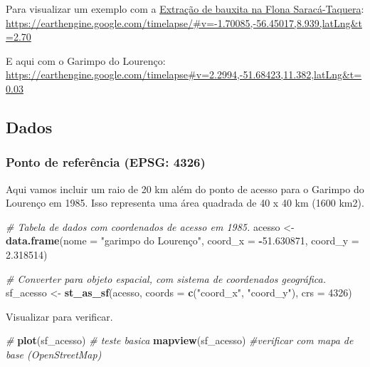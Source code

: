 \documentclass[
]{article}
\newenvironment{Shaded}{\begin{snugshade}}{\end{snugshade}}
\newcommand{\AttributeTok}[1]{\textcolor[rgb]{0.13,0.29,0.53}{#1}}
\newcommand{\CommentTok}[1]{\textcolor[rgb]{0.56,0.35,0.01}{\textit{#1}}}
\newcommand{\DecValTok}[1]{\textcolor[rgb]{0.00,0.00,0.81}{#1}}
\newcommand{\FloatTok}[1]{\textcolor[rgb]{0.00,0.00,0.81}{#1}}
\newcommand{\FunctionTok}[1]{\textcolor[rgb]{0.13,0.29,0.53}{\textbf{#1}}}
\newcommand{\NormalTok}[1]{#1}
\newcommand{\OtherTok}[1]{\textcolor[rgb]{0.56,0.35,0.01}{#1}}
\newcommand{\SpecialCharTok}[1]{\textcolor[rgb]{0.81,0.36,0.00}{\textbf{#1}}}
\newcommand{\StringTok}[1]{\textcolor[rgb]{0.31,0.60,0.02}{#1}}
\begin{document}
Para visualizar um exemplo com a \href{https://cpisp.org.br/mais-uma-uc-na-amazonia-sob-risco-mineracao-ameaca-flona-saraca-taquera-no-para/}{Extração de bauxita na Flona Saracá-Taquera}:
\url{https://earthengine.google.com/timelapse/\#v=-1.70085,-56.45017,8.939,latLng\&t=2.70}

E aqui com o Garimpo do Lourenço:
\url{https://earthengine.google.com/timelapse\#v=2.2994,-51.68423,11.382,latLng\&t=0.03}

\hypertarget{dados-2}{%
\subsection{Dados}\label{dados-2}}

\hypertarget{ponto-de-referuxeancia-epsg-4326}{%
\subsubsection{Ponto de referência (EPSG: 4326)}\label{ponto-de-referuxeancia-epsg-4326}}

Aqui vamos incluir um raio de 20 km além do ponto de acesso para
o Garimpo do Lourenço em 1985.
Isso representa uma área quadrada de 40 x 40 km (1600 km2).

\begin{Shaded}
\begin{Highlighting}[]
\CommentTok{\# Tabela de dados com coordenados de acesso em 1985.}
\NormalTok{acesso }\OtherTok{\textless{}{-}} \FunctionTok{data.frame}\NormalTok{(}\AttributeTok{nome =} \StringTok{"garimpo do Lourenço"}\NormalTok{, }
           \AttributeTok{coord\_x =} \SpecialCharTok{{-}}\FloatTok{51.630871}\NormalTok{, }
           \AttributeTok{coord\_y =} \FloatTok{2.318514}\NormalTok{)}
           
\CommentTok{\# Converter para objeto espacial, com sistema de coordenados geográfica.}
\NormalTok{sf\_acesso }\OtherTok{\textless{}{-}} \FunctionTok{st\_as\_sf}\NormalTok{(acesso, }
               \AttributeTok{coords =} \FunctionTok{c}\NormalTok{(}\StringTok{"coord\_x"}\NormalTok{, }\StringTok{"coord\_y"}\NormalTok{),}
            \AttributeTok{crs =} \DecValTok{4326}\NormalTok{)}
\end{Highlighting}
\end{Shaded}

Visualizar para verificar.

\begin{Shaded}
\begin{Highlighting}[]
\CommentTok{\# }
\FunctionTok{plot}\NormalTok{(sf\_acesso) }\CommentTok{\# teste basica}
\FunctionTok{mapview}\NormalTok{(sf\_acesso) }\CommentTok{\#verificar com mapa de base (OpenStreetMap)}
\end{Highlighting}
\end{Shaded}
\end{document}

